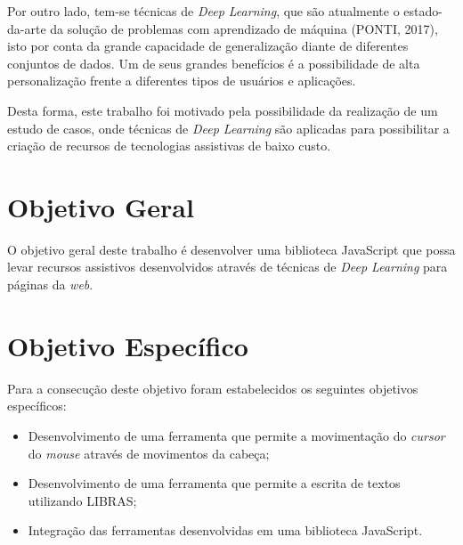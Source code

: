 \par Por outro lado, tem-se técnicas de \textit{Deep Learning}, que são atualmente o estado-da-arte da solução de problemas com aprendizado de máquina (PONTI, 2017), isto por conta da grande capacidade de generalização diante de diferentes conjuntos de dados. Um de seus grandes benefícios é a possibilidade de alta personalização frente a diferentes tipos de usuários e aplicações.

\par Desta forma, este trabalho foi motivado pela possibilidade da realização de um estudo de casos, onde técnicas de \textit{Deep Learning} são aplicadas para possibilitar a criação de recursos de tecnologias assistivas de baixo custo.

\section{Objetivo Geral}

\par O objetivo geral deste trabalho é desenvolver uma biblioteca JavaScript que possa levar recursos assistivos desenvolvidos através de técnicas de \textit{Deep Learning} para páginas da \textit{web}.


\section{Objetivo Espec\'ifico}

\par Para a consecução deste objetivo foram estabelecidos os seguintes objetivos específicos:

\begin{itemize}
    \item Desenvolvimento de uma ferramenta que permite a movimentação do \textit{cursor} do \textit{mouse} através de movimentos da cabeça;
    \item Desenvolvimento de uma ferramenta que permite a escrita de textos utilizando LIBRAS;
    \item Integração das ferramentas desenvolvidas em uma biblioteca JavaScript.
\end{itemize}

